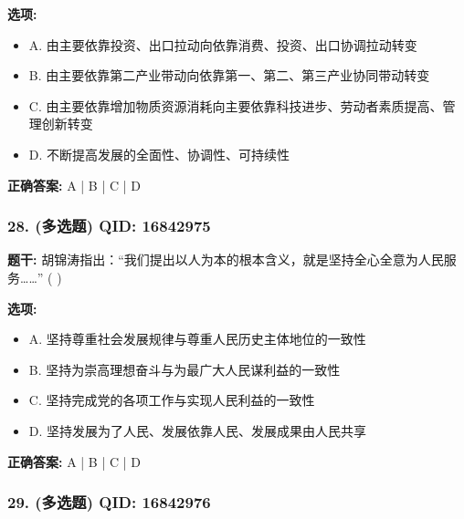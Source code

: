 \documentclass[12pt,UTF8]{ctexart}
\begin{document}
\textbf{选项:}
\begin{itemize}[leftmargin=*]

  \item A. 由主要依靠投资、出口拉动向依靠消费、投资、出口协调拉动转变

  \item B. 由主要依靠第二产业带动向依靠第一、第二、第三产业协同带动转变

  \item C. 由主要依靠增加物质资源消耗向主要依靠科技进步、劳动者素质提高、管理创新转变

  \item D. 不断提高发展的全面性、协调性、可持续性

\end{itemize}

\textbf{正确答案:}
A | B | C | D

\vspace{0.3em}\hrulefill\vspace{0.7em}

\subsubsection*{28. (多选题) \small QID: 16842975}

\textbf{题干:}
胡锦涛指出：“我们提出以人为本的根本含义，就是坚持全心全意为人民服务……” ( )

\textbf{选项:}
\begin{itemize}[leftmargin=*]

  \item A. 坚持尊重社会发展规律与尊重人民历史主体地位的一致性

  \item B. 坚持为崇高理想奋斗与为最广大人民谋利益的一致性

  \item C. 坚持完成党的各项工作与实现人民利益的一致性

  \item D. 坚持发展为了人民、发展依靠人民、发展成果由人民共享

\end{itemize}

\textbf{正确答案:}
A | B | C | D

\vspace{0.3em}\hrulefill\vspace{0.7em}

\subsubsection*{29. (多选题) \small QID: 16842976}
\end{document}
